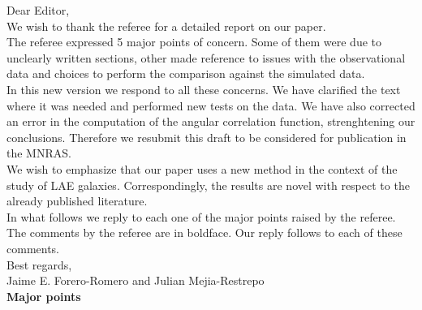 \documentclass[12pts]{article}
\begin{document}
Dear Editor, \\

We wish to thank the referee for a detailed report on our paper. \\

The referee expressed 5 major points of concern. Some of them were due
to unclearly written sections, other made reference to issues with the
observational data and choices to perform the comparison against the
simulated data.\\ 

In this new version we respond to all these concerns. We have
clarified the text where it was needed and performed new tests on the
data. We have also corrected an error in the computation of the
angular correlation function, strenghtening our conclusions. Therefore
we resubmit this draft to be considered for publication in the MNRAS.\\ 

We wish to emphasize that our paper uses a new method in the context
of the study of LAE galaxies. Correspondingly, the results are novel
with respect to the already published literature.\\

In what follows we reply to each one of the major points raised by the
referee. The comments by the referee are in boldface. Our reply
follows to each of these comments.\\


Best regards,\\

Jaime E. Forero-Romero and Julian Mejia-Restrepo\\


{\large \bf Major points}\\
\end{document}
